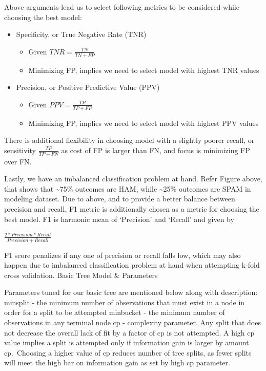 \documentclass[
]{article}
\providecommand{\tightlist}{%
  \setlength{\itemsep}{0pt}\setlength{\parskip}{0pt}}
\begin{document}
Above arguments lead us to select following metrics to be considered
while choosing the best model:

\begin{itemize}
\item
  Specificity, or True Negative Rate (TNR)

  \begin{itemize}
  \tightlist
  \item
    Given \(TNR=\frac{TN}{TN+FP}\)
  \item
    Minimizing FP, implies we need to select model with highest TNR
    values
  \end{itemize}
\item
  Precision, or Positive Predictive Value (PPV)

  \begin{itemize}
  \tightlist
  \item
    Given \(PPV=\frac{TP}{TP+FP}\)
  \item
    Minimizing FP, implies we need to select model with highest PPV
    values
  \end{itemize}
\end{itemize}

There is additional flexibility in choosing model with a slightly poorer
recall, or sensitivity \(\frac{TP}{TP+FN}\) as cost of FP is larger than
FN, and focus is minimizing FP over FN.

Lastly, we have an imbalanced classification problem at hand. Refer
Figure above, that shows that \textasciitilde75\% outcomes are HAM,
while \textasciitilde25\% outcomes are SPAM in modeling dataset. Due to
above, and to provide a better balance between precision and recall, F1
metric is additionally chosen as a metric for choosing the best model.
F1 is harmonic mean of `Precision' and `Recall' and given by

\(\frac{2*Precision*Recall}{Precision+Recall}\)

F1 score penalizes if any one of precision or recall falls low, which
may also happen due to imbalanced classification problem at hand when
attempting k-fold cross validation. Basic Tree Model \& Parameters

Parameters tuned for our basic tree are mentioned below along with
description: minsplit - the minimum number of observations that must
exist in a node in order for a split to be attempted minbucket - the
minimum number of observations in any terminal node cp - complexity
parameter. Any split that does not decrease the overall lack of ﬁt by a
factor of cp is not attempted. A high cp value implies a split is
attempted only if information gain is larger by amount cp.~Choosing a
higher value of cp reduces number of tree splits, as fewer splits will
meet the high bar on information gain as set by high cp parameter.
\end{document}
